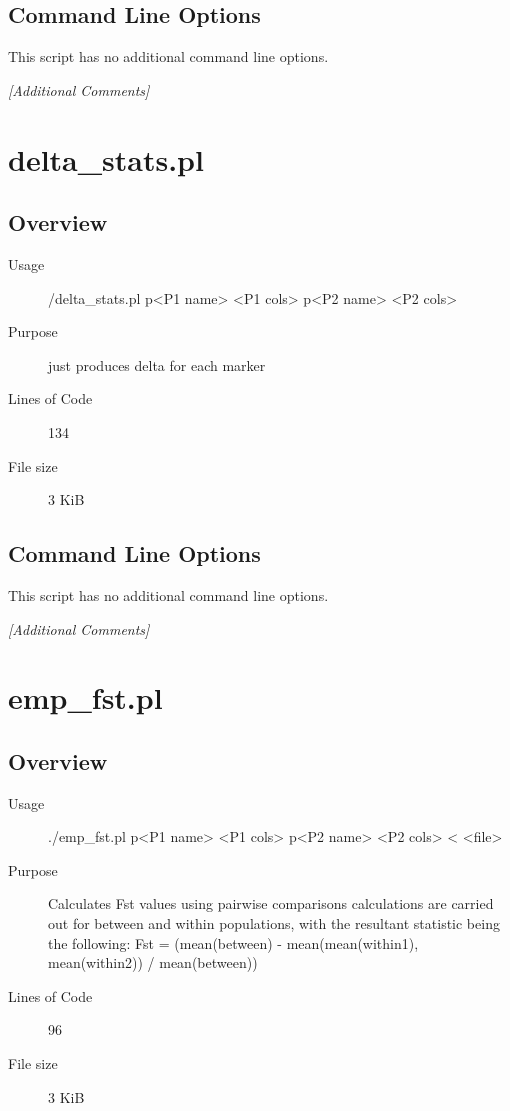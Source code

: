 \subsection{Command Line Options}
\label{sec:coriell2snpchip.pl-command-line}

This script has no additional command line options.

\emph{[Additional Comments]}

\section{delta_stats.pl}
\label{sec:delta-stats.pl}

\subsection{Overview}
\label{sec:delta-stats.pl-overview}

\begin{description}
\item[Usage] /delta_stats.pl p<P1 name> <P1 cols> p<P2 name> <P2 cols>
\item[Purpose] just produces delta for each marker
\item[Lines of Code] 134
\item[File size] 3 KiB
\end{description}

\subsection{Command Line Options}
\label{sec:delta-stats.pl-command-line}

This script has no additional command line options.

\emph{[Additional Comments]}

\section{emp_fst.pl}
\label{sec:emp-fst.pl}

\subsection{Overview}
\label{sec:emp-fst.pl-overview}

\begin{description}
\item[Usage] ./emp_fst.pl p<P1 name> <P1 cols> p<P2 name> <P2 cols> < <file>
\item[Purpose] Calculates Fst values using pairwise comparisons calculations are carried out for between and within populations, with the resultant statistic being the following: Fst = (mean(between) - mean(mean(within1), mean(within2)) / mean(between))
\item[Lines of Code] 96
\item[File size] 3 KiB
\end{description}

